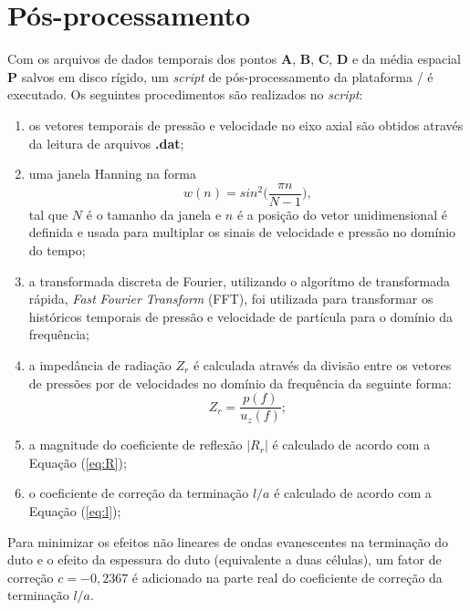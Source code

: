 \section{Pós-processamento}

Com os arquivos de dados temporais dos pontos $\textbf{A}$, $\textbf{B}$, $\textbf{C}$, $\textbf{D}$ e da média espacial $\textbf{P}$ salvos em disco rígido, um \textit{script} de pós-processamento da plataforma / é executado. Os seguintes procedimentos são realizados no \textit{script}:

\begin{enumerate}
  \item os vetores temporais de pressão e velocidade no eixo axial são obtidos através da leitura de arquivos \textbf{.dat};
  \item uma janela Hanning na forma
  \begin{equation}
    w(n) = sin^{2}\bigg(\frac{\pi n}{N - 1} \bigg),  
  \end{equation}
  tal que $N$ é o tamanho da janela e $n$ é a posição do vetor unidimensional é definida e usada para multiplar os sinais de velocidade e pressão no domínio do tempo;

  \item a transformada discreta de Fourier, utilizando o algorítmo de transformada rápida, \textit{Fast} \textit{Fourier} \textit{Transform} (FFT), foi utilizada para transformar os históricos temporais de pressão e velocidade de partícula para o domínio da frequência;

  \item a impedância de radiação $Z_{r}$ é calculada através da divisão entre os vetores de pressões por de velocidades no domínio da frequência da seguinte forma:
  \begin{equation}
    Z_{r} = \frac{p(f)}{u_{z}(f)};
  \end{equation}

  \item a magnitude do coeficiente de reflexão $|R_{r}|$ é calculado de acordo com a Equação (\ref{eq:R});
  \item o coeficiente de correção da terminação $l/a$ é calculado de acordo com a Equação (\ref{eq:l});
 \end{enumerate}

 Para minimizar os efeitos não lineares de ondas evanescentes na terminação do duto e o efeito da espessura do duto (equivalente a duas células), um fator de correção $c = - 0,2367$ é adicionado na parte real do coeficiente de correção da terminação $l/a$.

